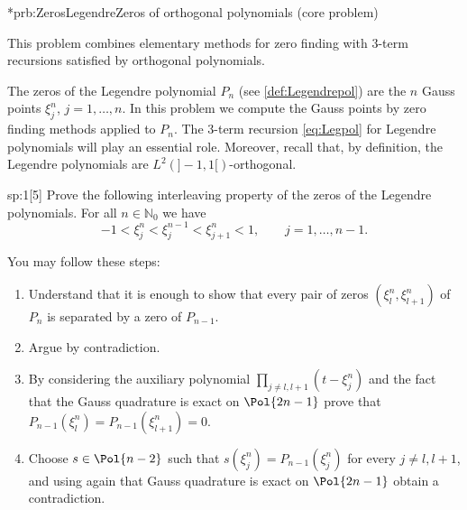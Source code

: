 
\begin{samproblem}*{prb:ZerosLegendre}{Zeros of orthogonal polynomials (core problem)}{
  This problem combines elementary methods for zero finding with 3-term recursions satisfied by orthogonal polynomials. 
  
  The zeros of the Legendre polynomial $P_n$ (see \cref{def:Legendrepol}) are the $n$ Gauss points $\xi^n_j$, $j=1,\dots,n$. 
  In this problem we compute the Gauss points by zero finding methods applied to $P_n$. The 3-term recursion \cref{eq:Legpol} 
  for Legendre polynomials will play an essential role. Moreover, recall that, by definition, the Legendre polynomials are 
  $L^2(]-1,1[)$-orthogonal.
}

\begin{subproblem}{sp:1}[5]
  Prove the following interleaving property of the zeros of the Legendre polynomials. For all $n\in\mathbb{N}_0$ we have
  \begin{equation*}
    -1<\xi^n_j<\xi^{n-1}_j<\xi^n_{j+1}<1,\qquad j=1,\dots,n-1.
  \end{equation*}
  \begin{samhint}
    You may follow these steps:
    \begin{enumerate}\itemsep0pt
      \item Understand that it is enough to show that every pair of zeros $(\xi^n_l,\xi^n_{l+1})$ of $P_n$ is separated 
            by a zero of $P_{n-1}$.
      \item Argue by contradiction.
      \item By considering the auxiliary polynomial $\prod_{j\neq l,l+1} (t-\xi_j^n)$ and the fact that the Gauss quadrature 
            is exact on $\Pol{2n-1}$ prove that $P_{n-1}(\xi_l^n)=P_{n-1}(\xi_{l+1}^n)=0$.
      \item Choose $s\in \Pol{n-2}$ such that $s(\xi^n_j)=P_{n-1}(\xi_j^n)$ for every $j\neq l,l+1$, and using again that
            Gauss quadrature is exact on $\Pol{2n-1}$ obtain a contradiction.
    \end{enumerate}
  \end{samhint}


\end{subproblem}
\end{samproblem}
